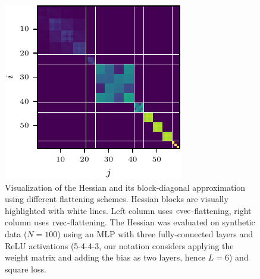 \begin{figure}
\begin{minipage}[t]{0.495\linewidth}
  \end{minipage}
  \hfill
  \begin{minipage}[t]{0.495\linewidth}
    \centering
    \includegraphics[width=\linewidth]{../kfs/plots/synthetic_rvec_hessian_bda.pdf}
  \end{minipage}
  \caption{Visualization of the Hessian and its block-diagonal approximation using different flattening schemes.
    Hessian blocks are visually highlighted with white lines.
    Left column uses $\operatorname{cvec}$-flattening, right column uses $\operatorname{rvec}$-flattening.
    The Hessian was evaluated on synthetic data ($N=100$) using an MLP with three fully-connected layers and ReLU activations (5-4-4-3, our notation considers applying the weight matrix and adding the bias as two layers, hence $L=6$) and square loss.
  }
\end{figure}

\switchcolumn[0]

